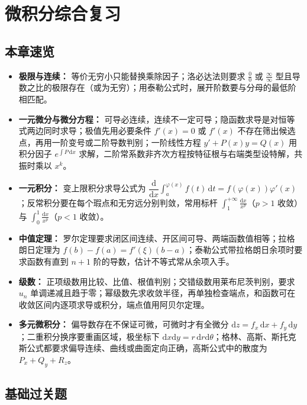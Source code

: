\section{微积分综合复习}

\subsection{本章速览}

\begin{itemize}
\item \textbf{极限与连续：} 等价无穷小只能替换乘除因子；洛必达法则要求 $\frac00$ 或 $\frac{\infty}{\infty}$ 型且导数之比的极限存在（或为无穷）；用泰勒公式时，展开阶数要与分母的最低阶相匹配。
\item \textbf{一元微分与微分方程：} 可导必连续，连续不一定可导；隐函数求导是对恒等式两边同时求导；极值先用必要条件 $f'(x)=0$ 或 $f'(x)$ 不存在筛出候选点，再用一阶变号或二阶导数判别；一阶线性方程 $y'+P(x)y=Q(x)$ 用积分因子 $e^{\int P\,\mathrm{d}x}$ 求解，二阶常系数非齐次方程按特征根与右端类型设特解，共振时乘以 $x^k$。
\item \textbf{一元积分：} 变上限积分求导公式为 $\dfrac{\mathrm{d}}{\mathrm{d}x}\displaystyle\int_a^{\varphi(x)}f(t)\,\mathrm{d}t=f(\varphi(x))\varphi'(x)$；反常积分要在每个瑕点和无穷远分别判敛，常用标杆 $\displaystyle\int_1^{+\infty}\frac{\mathrm{d}x}{x^p}$（$p>1$ 收敛）与 $\displaystyle\int_0^1\frac{\mathrm{d}x}{x^p}$（$p<1$ 收敛）。
\item \textbf{中值定理：} 罗尔定理要求闭区间连续、开区间可导、两端函数值相等；拉格朗日定理为 $f(b)-f(a)=f'(\xi)(b-a)$；泰勒公式带拉格朗日余项时要求函数有直到 $n+1$ 阶的导数，估计不等式常从余项入手。
\item \textbf{级数：} 正项级数用比较、比值、根值判别；交错级数用莱布尼茨判别，要求 $u_n$ 单调递减且趋于零；幂级数先求收敛半径，再单独检查端点，和函数可在收敛区间内逐项求导或积分，端点值用阿贝尔定理。
\item \textbf{多元微积分：} 偏导数存在不保证可微，可微时才有全微分 $\mathrm{d}z=f_x\,\mathrm{d}x+f_y\,\mathrm{d}y$；二重积分换序要重画区域，极坐标下 $\mathrm{d}x\mathrm{d}y=r\,\mathrm{d}r\mathrm{d}\theta$；格林、高斯、斯托克斯公式都要求偏导连续、曲线或曲面定向正确，高斯公式中的散度为 $P_x+Q_y+R_z$。
\end{itemize}

\subsection{基础过关题}

